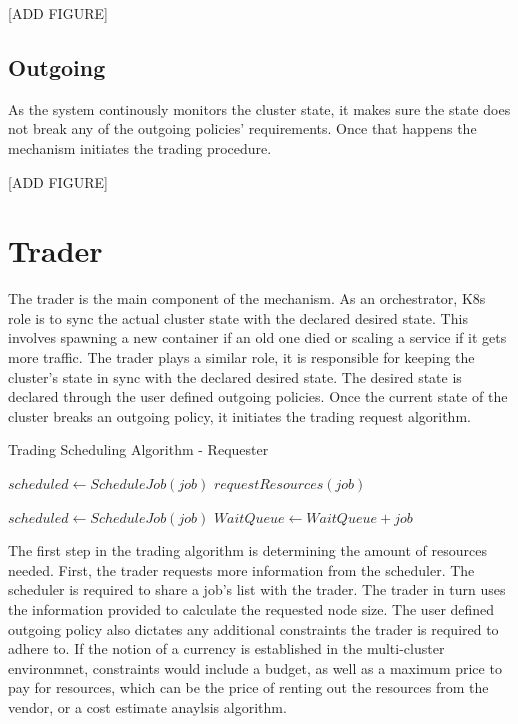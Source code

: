 [ADD FIGURE]

\subsection{Outgoing}

As the system continously monitors the cluster state, it makes sure the state
does not break any of the outgoing policies' requirements. Once that happens
the mechanism initiates the trading procedure. 

[ADD FIGURE]

\section{Trader}

The trader is the main component of the mechanism. As an orchestrator, K8s role
is to sync the actual cluster state with the declared desired state. This
involves spawning a new container if an old one died or scaling a service if it
gets more traffic. The trader plays a similar role, it is responsible for
keeping the cluster's state in sync with the declared desired state. The
desired state is declared through the user defined outgoing policies. Once the
current state of the cluster breaks an outgoing policy, it initiates the
trading request algorithm. 
\begin{algorithm}[H]
\caption{Trading Scheduling Algorithm - Requester}
\begin{algorithmic}
        \State $scheduled \gets ScheduleJob(job)$
        \State $requestResources(job)$
        \EndIf
    \EndFor

        \State $scheduled \gets ScheduleJob(job)$
        \State $WaitQueue \gets WaitQueue + job$
        \EndIf
    \EndFor
\end{algorithmic}
\end{algorithm}

The first step in the trading algorithm is determining the amount of resources
needed. First, the trader requests more information from the scheduler. The
scheduler is required to share a job's list with the trader. The trader in turn
uses the information provided to calculate the requested node size. The user
defined outgoing policy also dictates any additional constraints the trader is
required to adhere to. If the notion of a currency is established in the
multi-cluster environmnet, constraints would include a budget, as well as a
maximum price to pay for resources, which can be the price of renting out the
resources from the vendor, or a cost estimate anaylsis algorithm. 

